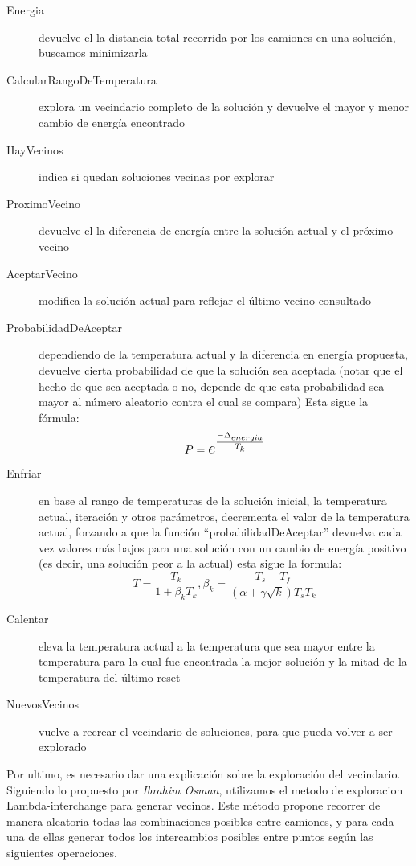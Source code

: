 \begin{description}
\item[Energia] devuelve el la distancia total recorrida por los camiones en una solución, buscamos minimizarla

\item[CalcularRangoDeTemperatura] explora un vecindario completo de la solución y devuelve el mayor y menor cambio de energía encontrado

\item[HayVecinos] indica si quedan soluciones vecinas por explorar

\item[ProximoVecino] devuelve el la diferencia de energía entre la solución actual y el próximo vecino

\item[AceptarVecino] modifica la solución actual para reflejar el último vecino consultado

\item[ProbabilidadDeAceptar] dependiendo de la temperatura actual y la diferencia en energía propuesta, devuelve cierta probabilidad de que la solución sea aceptada (notar que el hecho de que sea aceptada o no, depende de que esta probabilidad sea mayor al número aleatorio contra el cual se compara) Esta sigue la fórmula:
$$ P = \mathlarger{\mathlarger{e^\frac{-\Delta_{energia}}{T_k}}} $$

\item[Enfriar] en base al rango de temperaturas de la solución inicial, la temperatura actual, iteración y otros parámetros, decrementa el valor de la temperatura actual, forzando a que la función “probabilidadDeAceptar” devuelva cada vez valores más bajos para una solución con un cambio de energía positivo (es decir, una solución peor a la actual)
esta sigue la formula: 
$$ T = \frac{T_k}{1+ \beta_k T_k},  \beta_k = \frac{T_s - T_f}{(\alpha + \gamma \sqrt{k} )T_s T_k} $$

\item[Calentar] eleva la temperatura actual a la temperatura que sea mayor entre la temperatura para la cual fue encontrada la mejor solución y la mitad de la temperatura del último reset

\item[NuevosVecinos] vuelve a recrear el vecindario de soluciones, para que pueda volver a ser explorado
\end{description}

Por ultimo, es necesario dar una explicación sobre la exploración del vecindario. Siguiendo lo propuesto por \textit{Ibrahim Osman}, utilizamos el metodo de exploracion Lambda-interchange para generar vecinos. Este método propone recorrer de manera aleatoria todas las combinaciones posibles entre camiones, y para cada una de ellas generar todos los intercambios posibles entre puntos según las siguientes operaciones.

